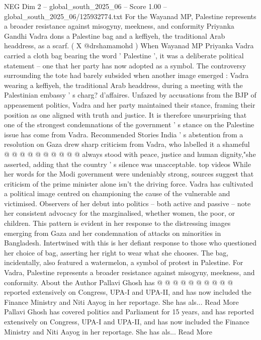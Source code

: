 \begin{textsample}{NEG Dim 2 – global\_south\_2025\_06 – Score 1.00 – global\_south\_2025\_06/125932774.txt}  \label{ex:f2_neg_366}
For the Wayanad MP, Palestine represents a broader resistance against misogyny, meekness, and conformity Priyanka Gandhi Vadra dons a Palestine bag and a keffiyeh, the traditional Arab headdress, as a scarf. ( X @drshamamohd ) When Wayanad MP Priyanka Vadra carried a cloth bag bearing the word ' Palestine ', it was a deliberate political statement -- one that her party has now adopted as a symbol.
The controversy surrounding the tote had barely subsided when another image emerged : Vadra wearing a keffiyeh, the traditional Arab headdress, during a meeting with the Palestinian embassy ' s charg? d'affaires.
Unfazed by accusations from the BJP of appeasement politics, Vadra and her party maintained their stance, framing their position as one aligned with truth and justice.
It is therefore unsurprising that one of the strongest condemnations of the government ' s stance on the Palestine issue has come from Vadra.
Recommended Stories India ' s abstention from a resolution on Gaza drew sharp criticism from Vadra, who labelled it a shameful @ @ @ @ @ @ @ @ @ @ always stood with peace, justice and human dignity,"she asserted, adding that the country ' s silence was unacceptable. top videos While her words for the Modi government were undeniably strong, sources suggest that criticism of the prime minister alone isn't the driving force.
Vadra has cultivated a political image centred on championing the cause of the vulnerable and victimised.
Observers of her debut into politics -- both active and passive -- note her consistent advocacy for the marginalised, whether women, the poor, or children.
This pattern is evident in her response to the distressing images emerging from Gaza and her condemnation of attacks on minorities in Bangladesh.
Intertwined with this is her defiant response to those who questioned her choice of bag, asserting her right to wear what she chooses.
The bag, incidentally, also featured a watermelon, a symbol of protest in Palestine.
For Vadra, Palestine represents a broader resistance against misogyny, meekness, and conformity.
About the Author Pallavi Ghosh has @ @ @ @ @ @ @ @ @ @ reported extensively on Congress, UPA-I and UPA-II, and has now included the Finance Ministry and Niti Aayog in her reportage.
She has als...
Read More Pallavi Ghosh has covered politics and Parliament for 15 years, and has reported extensively on Congress, UPA-I and UPA-II, and has now included the Finance Ministry and Niti Aayog in her reportage.
She has als...
Read More

\end{textsample}

